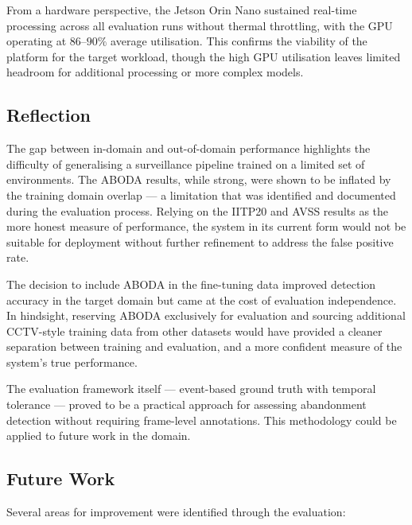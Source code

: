 From a hardware perspective, the Jetson Orin Nano sustained real-time
processing across all evaluation runs without thermal throttling, with the GPU
operating at $86$--$90\%$ average utilisation. This confirms the viability of
the platform for the target workload, though the high GPU utilisation leaves
limited headroom for additional processing or more complex models.

\subsection{Reflection}

The gap between in-domain and out-of-domain performance highlights the
difficulty of generalising a surveillance pipeline trained on a limited set of
environments. The ABODA results, while strong, were shown to be inflated by the
training domain overlap --- a limitation that was identified and documented
during the evaluation process. Relying on the IITP20 and AVSS results as the
more honest measure of performance, the system in its current form would not be
suitable for deployment without further refinement to address the false
positive rate.

The decision to include ABODA in the fine-tuning data improved detection
accuracy in the target domain but came at the cost of evaluation independence.
In hindsight, reserving ABODA exclusively for evaluation and sourcing
additional CCTV-style training data from other datasets would have provided a
cleaner separation between training and evaluation, and a more confident
measure of the system's true performance.

The evaluation framework itself --- event-based ground truth with temporal
tolerance --- proved to be a practical approach for assessing abandonment
detection without requiring frame-level annotations. This methodology could be
applied to future work in the domain.

\subsection{Future Work}

Several areas for improvement were identified through the evaluation:

